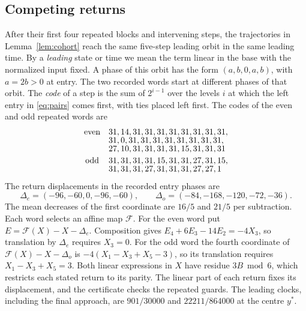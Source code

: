 \documentclass[11pt,reqno]{amsart}
\theoremstyle{remark}
\begin{document}
\subsection*{Competing returns}
After their first four repeated blocks and intervening steps, the trajectories in Lemma~\ref{lem:cohort} reach the same five-step leading orbit in the same leading time. By a \emph{leading} state or time we mean the term linear in the base with the normalized input fixed. A phase of this orbit has the form \((a,b,0,a,b)\), with \(a=2b>0\) at entry. The two recorded words start at different phases of that orbit. The \emph{code} of a step is the sum of \(2^{i-1}\) over the levels \(i\) at which the left entry in \eqref{eq:pairs} comes first, with ties placed left first. The codes of the even and odd repeated words are
\[
\begin{array}{@{}c@{\quad}l@{}}
 \text{even}&31,14,31,31,31,31,31,31,31,31,\\[-2pt]
 &31,0,31,31,31,31,31,31,31,31,\\[-2pt]
 &27,10,31,31,31,31,15,31,31,31\\[2pt]
 \text{odd}&31,31,31,31,15,31,31,27,31,15,\\[-2pt]
 &31,31,31,27,31,31,31,27,27,1
\end{array}
\]
The return displacements in the recorded entry phases are
\[
 \Delta_e=(-96,-60,0,-96,-60),\qquad
 \Delta_o=(-84,-168,-120,-72,-36).
\]
The mean decreases of the first coordinate are \(16/5\) and \(21/5\) per subtraction. Each word selects an affine map \(\mathcal F\). For the even word put \(E=\mathcal F(X)-X-\Delta_e\). Composition gives \(E_4+6E_3-14E_2=-4X_3\), so translation by \(\Delta_e\) requires \(X_3=0\). For the odd word the fourth coordinate of \(\mathcal F(X)-X-\Delta_o\) is \(-4(X_1-X_3+X_5-3)\), so its translation requires \(X_1-X_3+X_5=3\). Both linear expressions in \(X\) have residue \(3B\bmod6\), which restricts each stated return to its parity. The linear part of each return fixes its displacement, and the certificate checks the repeated guards. The leading clocks, including the final approach, are \(901/30000\) and \(22211/864000\) at the centre \(y^*\).
\end{document}
